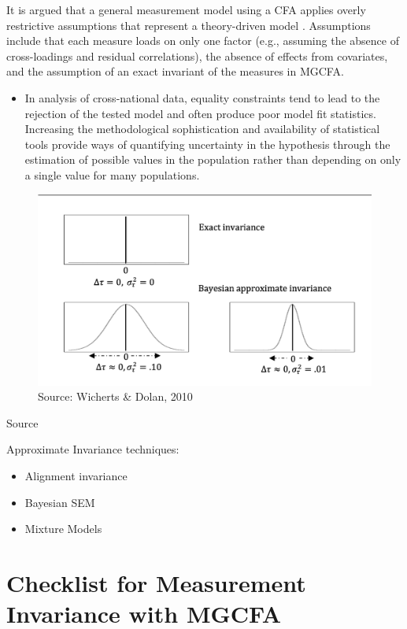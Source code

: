\documentclass[
]{book}
\providecommand{\tightlist}{%
  \setlength{\itemsep}{0pt}\setlength{\parskip}{0pt}}
\begin{document}
It is argued that a general measurement model using a CFA applies overly restrictive assumptions
that represent a theory-driven model \citep{Brown2015, Marsh2013}. Assumptions include that each measure loads on only one factor (e.g., assuming the absence of cross-loadings and residual correlations), the absence of effects from covariates, and the assumption of an exact invariant of the measures in MGCFA.

\begin{itemize}
\tightlist
\item
  In analysis of cross-national data, equality constraints tend to lead to the rejection of the tested model and often produce poor model fit statistics. Increasing the methodological sophistication and availability of statistical tools provide ways of quantifying uncertainty in the hypothesis through the estimation of possible values in the population rather than depending on only a single value for many populations.
\end{itemize}

\begin{figure}
\includegraphics[width=0.8\linewidth]{approximate} \caption{Source: Wicherts & Dolan, 2010}\label{fig:approximate}
\end{figure}

Source \citep{Desa2018}

Approximate Invariance techniques:

\begin{itemize}
\item
  Alignment invariance \citep{Muthen2018}
\item
  Bayesian SEM \citep{Lek2018}
\item
  Mixture Models \citep{DeRoover2019}
\end{itemize}

\hypertarget{check}{%
\chapter{Checklist for Measurement Invariance with MGCFA}\label{check}}
\end{document}
